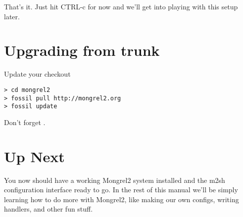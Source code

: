 That's it.  Just hit CTRL-c for now and we'll get into playing with this
setup later.

\section{Upgrading from trunk}
\begin{code}{Update your checkout}
\begin{lstlisting}
> cd mongrel2
> fossil pull http://mongrel2.org
> fossil update
\end{lstlisting}
\end{code}

Don't forget .


\section{Up Next}

You now should have a working Mongrel2 system installed and the m2sh configuration
interface ready to go.  In the rest of this manual we'll be simply learning how
to do more with Mongrel2, like making our own configs, writing handlers, and other
fun stuff.

